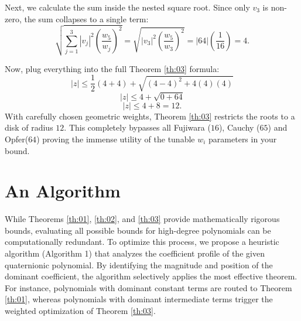 \documentclass [12pt]{article}
\begin{document}
\noindent Next, we calculate the sum inside the nested square root. Since only $v_3$ is non-zero, the sum collapses to a single term:
\[ \sqrt{\sum_{j=1}^{3}|v_{j}|^{2}\left(\frac{w_{5}}{w_{j}}\right)^{2}} = \sqrt{|v_3|^2 \left(\frac{w_5}{w_3}\right)^2} = |64| \left(\frac{1}{16}\right) = 4. \]

\noindent Now, plug everything into the full Theorem \ref{th:03} formula:
\[ |z| \le \frac{1}{2}(4 + 4) + \sqrt{(4 - 4)^{2} + 4(4)(4)} \]
\[ |z| \le 4 + \sqrt{0 + 64} \]
\[ |z| \le 4 + 8 = 12. \]
With carefully chosen geometric weights, Theorem \ref{th:03} restricts the roots to a disk of radius \textbf{$12$}. This completely bypasses all Fujiwara ($16$), Cauchy ($65$) and Opfer($64$) proving the immense utility of the tunable $w_i$ parameters in your bound.
\section*{An Algorithm}
While Theorems \ref{th:01}, \ref{th:02}, and \ref{th:03} provide mathematically rigorous bounds, evaluating all possible bounds for high-degree polynomials can be computationally redundant. To optimize this process, we propose a heuristic algorithm (Algorithm 1) that analyzes the coefficient profile of the given quaternionic polynomial. By identifying the magnitude and position of the dominant coefficient, the algorithm selectively applies the most effective theorem. For instance, polynomials with dominant constant terms are routed to Theorem \ref{th:01}, whereas polynomials with dominant intermediate terms trigger the weighted optimization of Theorem \ref{th:03}.
\end{document}
